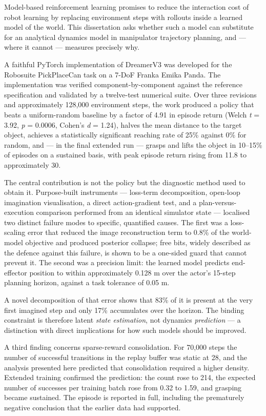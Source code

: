 \documentclass[12pt,a4paper,oneside]{report}
\begin{document}
Model-based reinforcement learning promises to reduce the interaction cost of
robot learning by replacing environment steps with rollouts inside a learned
model of the world. This dissertation asks whether such a model can substitute
for an analytical dynamics model in manipulator trajectory planning, and --- where
it cannot --- measures precisely why.

A faithful PyTorch implementation of DreamerV3 was developed for the Robosuite
PickPlaceCan task on a 7-DoF Franka Emika Panda. The implementation was verified
component-by-component against the reference specification and validated by a
twelve-test numerical suite. Over three revisions and approximately 128,000
environment steps, the work produced a policy that beats a uniform-random
baseline by a factor of 4.91 in episode return (Welch \emph{t} = 3.92, \emph{p} = 0.0006,
Cohen's \emph{d} = 1.24), halves the mean distance to the target object, achieves a
statistically significant reaching rate of 25\% against 0\% for random, and ---
in the final extended run --- grasps and lifts the object in 10--15\% of episodes
on a sustained basis, with peak episode return rising from 11.8 to
approximately 30.

The central contribution is not the policy but the diagnostic method used to
obtain it. Purpose-built instruments --- loss-term decomposition, open-loop
imagination visualisation, a direct action-gradient test, and a plan-versus-
execution comparison performed from an identical simulator state --- localised two
distinct failure modes to specific, quantified causes. The first was a
loss-scaling error that reduced the image reconstruction term to 0.8\% of the
world-model objective and produced posterior collapse; free bits, widely
described as the defence against this failure, is shown to be a one-sided guard
that cannot prevent it. The second was a precision limit: the learned model
predicts end-effector position to within approximately 0.128 m over the actor's
15-step planning horizon, against a task tolerance of 0.05 m.

A novel decomposition of that error shows that 83\% of it is present at the very
first imagined step and only 17\% accumulates over the horizon. The binding
constraint is therefore latent \emph{state estimation}, not dynamics \emph{prediction} ---
a distinction with direct implications for how such models should be improved.

A third finding concerns sparse-reward consolidation. For 70,000 steps the
number of successful transitions in the replay buffer was static at 28, and the
analysis presented here predicted that consolidation required a higher density.
Extended training confirmed the prediction: the count rose to 214, the expected
number of successes per training batch rose from 0.32 to 1.59, and grasping
became sustained. The episode is reported in full, including the prematurely
negative conclusion that the earlier data had supported.
\end{document}
